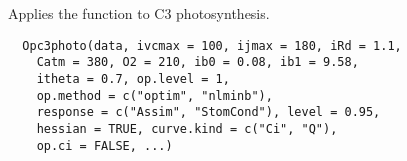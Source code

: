\documentclass[letterpaper]{book}
\begin{document}
%
\begin{Description}\relax
Applies the  function to C3 photosynthesis.
\end{Description}
%
\begin{Usage}
\begin{verbatim}
  Opc3photo(data, ivcmax = 100, ijmax = 180, iRd = 1.1,
    Catm = 380, O2 = 210, ib0 = 0.08, ib1 = 9.58,
    itheta = 0.7, op.level = 1,
    op.method = c("optim", "nlminb"),
    response = c("Assim", "StomCond"), level = 0.95,
    hessian = TRUE, curve.kind = c("Ci", "Q"),
    op.ci = FALSE, ...)
\end{verbatim}
\end{Usage}
%
\end{document}

